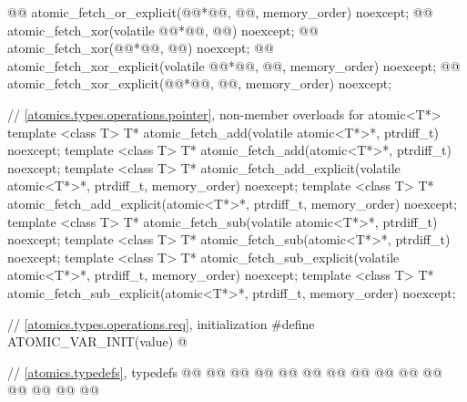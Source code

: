 \begin{codeblock}
{  @@ atomic_fetch_or_explicit(@@*@\itcorr[-1]@, @@, memory_order) noexcept;
  @@ atomic_fetch_xor(volatile @@*@\itcorr[-1]@, @@) noexcept;
  @@ atomic_fetch_xor(@@*@\itcorr[-1]@, @@) noexcept;
  @@ atomic_fetch_xor_explicit(volatile @@*@\itcorr[-1]@, @@, memory_order) noexcept;
  @@ atomic_fetch_xor_explicit(@@*@\itcorr[-1]@, @@, memory_order) noexcept;

  // \ref{atomics.types.operations.pointer}, non-member overloads for atomic<T*>
  template <class T>
    T* atomic_fetch_add(volatile atomic<T*>*, ptrdiff_t) noexcept;
  template <class T>
    T* atomic_fetch_add(atomic<T*>*, ptrdiff_t) noexcept;
  template <class T>
    T* atomic_fetch_add_explicit(volatile atomic<T*>*, ptrdiff_t, memory_order) noexcept;
  template <class T>
    T* atomic_fetch_add_explicit(atomic<T*>*, ptrdiff_t, memory_order) noexcept;
  template <class T>
    T* atomic_fetch_sub(volatile atomic<T*>*, ptrdiff_t) noexcept;
  template <class T>
    T* atomic_fetch_sub(atomic<T*>*, ptrdiff_t) noexcept;
  template <class T>
    T* atomic_fetch_sub_explicit(volatile atomic<T*>*, ptrdiff_t, memory_order) noexcept;
  template <class T>
    T* atomic_fetch_sub_explicit(atomic<T*>*, ptrdiff_t, memory_order) noexcept;

  // \ref{atomics.types.operations.req}, initialization
  #define ATOMIC_VAR_INIT(value) @\seebelow@

  // \ref{atomics.typedefs}, typedefs
  @@
  @@
  @@
  @@
  @@
  @@
  @@
  @@
  @@
  @@
  @@
  @@
  @@
  @@
  @@

}
\end{codeblock}
